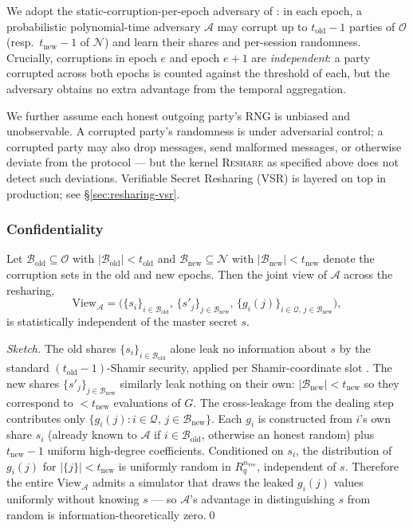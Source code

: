 We adopt the static-corruption-per-epoch adversary of \cite{hjky97}: in each epoch, a probabilistic polynomial-time adversary $\mathcal{A}$ may corrupt up to $t_{\mathrm{old}} - 1$ parties of $\mathcal{O}$ (resp.\ $t_{\mathrm{new}} - 1$ of $\mathcal{N}$) and learn their shares and per-session randomness. Crucially, corruptions in epoch $e$ and epoch $e+1$ are \emph{independent}: a party corrupted across both epochs is counted against the threshold of each, but the adversary obtains no extra advantage from the temporal aggregation.

We further assume each honest outgoing party's RNG is unbiased and unobservable. A corrupted party's randomness is under adversarial control; a corrupted party may also drop messages, send malformed messages, or otherwise deviate from the protocol --- but the kernel \textsc{Reshare} as specified above does not detect such deviations. Verifiable Secret Resharing (VSR) is layered on top in production; see \S\ref{sec:resharing-vsr}.

\subsubsection{Confidentiality}

\begin{theorem}
\label{thm:resharing-confidentiality}
Let $\mathcal{B}_{\mathrm{old}} \subseteq \mathcal{O}$ with $|\mathcal{B}_{\mathrm{old}}| < t_{\mathrm{old}}$ and $\mathcal{B}_{\mathrm{new}} \subseteq \mathcal{N}$ with $|\mathcal{B}_{\mathrm{new}}| < t_{\mathrm{new}}$ denote the corruption sets in the old and new epochs. Then the joint view of $\mathcal{A}$ across the resharing,
\[
\mathrm{View}_\mathcal{A} = \bigl(\{s_i\}_{i \in \mathcal{B}_{\mathrm{old}}},\, \{s'_j\}_{j \in \mathcal{B}_{\mathrm{new}}},\, \{g_i(j)\}_{i \in \mathcal{Q},\, j \in \mathcal{B}_{\mathrm{new}}}\bigr),
\]
is statistically independent of the master secret $s$.
\end{theorem}

\begin{proof}[Sketch]
The old shares $\{s_i\}_{i \in \mathcal{B}_{\mathrm{old}}}$ alone leak no information about $s$ by the standard $(t_{\mathrm{old}}-1)$-Shamir security, applied per Shamir-coordinate slot \cite{shamir79}. The new shares $\{s'_j\}_{j \in \mathcal{B}_{\mathrm{new}}}$ similarly leak nothing on their own: $|\mathcal{B}_{\mathrm{new}}| < t_{\mathrm{new}}$ so they correspond to $< t_{\mathrm{new}}$ evaluations of $G$. The cross-leakage from the dealing step contributes only $\{g_i(j) : i \in \mathcal{Q},\, j \in \mathcal{B}_{\mathrm{new}}\}$. Each $g_i$ is constructed from $i$'s own share $s_i$ (already known to $\mathcal{A}$ if $i \in \mathcal{B}_{\mathrm{old}}$, otherwise an honest random) plus $t_{\mathrm{new}} - 1$ uniform high-degree coefficients. Conditioned on $s_i$, the distribution of $g_i(j)$ for $|\{j\}| < t_{\mathrm{new}}$ is uniformly random in $R_q^{n_{\textrm{vec}}}$, independent of $s$. Therefore the entire $\mathrm{View}_\mathcal{A}$ admits a simulator that draws the leaked $g_i(j)$ values uniformly without knowing $s$ --- so $\mathcal{A}$'s advantage in distinguishing $s$ from random is information-theoretically zero.\qed
\end{proof}

